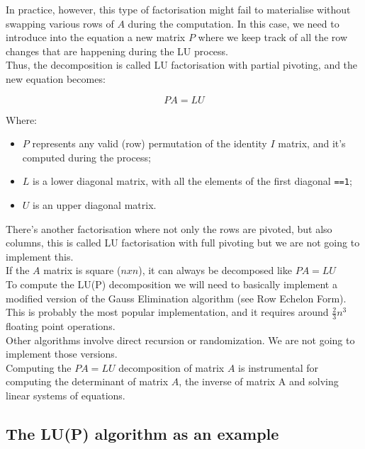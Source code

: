 In practice, however, this type of factorisation might fail to materialise without swapping various rows of $A$ during the computation. In this case, we need to introduce into the equation a new matrix $P$ where we keep track of all the row changes that are happening during the LU process.
\\

Thus, the decomposition is called LU factorisation with partial pivoting, and the new equation becomes:

$$
PA = LU
$$

Where:
\\

\begin{itemize}
\item $P$ represents any valid (row) permutation of the identity $I$ matrix, and it’s computed during the process;
\item $L$ is a lower diagonal matrix, with all the elements of the first diagonal {\tt ==1};
\item $U$ is an upper diagonal matrix.
\end{itemize}

There’s another factorisation where not only the rows are pivoted, but also columns, this is called LU factorisation with full pivoting but we are not going to implement this.
\\

If the $A$ matrix is square ($nxn$), it can always be decomposed like $PA=LU$
\\

To compute the LU(P) decomposition we will need to basically implement a modified version of the Gauss Elimination algorithm (see Row Echelon Form). This is probably the most popular implementation, and it requires around $\frac{2}{3} n^3$ floating point operations.
\\

Other algorithms involve direct recursion or randomization. We are not going to implement those versions.
\\

Computing the $PA=LU$ decomposition of matrix $A$ is instrumental for computing the determinant of matrix $A$, the inverse of matrix A and solving linear systems of equations.

\subsection{The LU(P) algorithm as an example}


